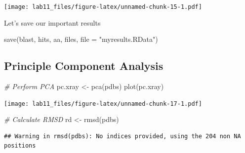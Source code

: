 \documentclass[
]{article}
\newenvironment{Shaded}{\begin{snugshade}}{\end{snugshade}}
\newcommand{\AttributeTok}[1]{\textcolor[rgb]{0.77,0.63,0.00}{#1}}
\newcommand{\CommentTok}[1]{\textcolor[rgb]{0.56,0.35,0.01}{\textit{#1}}}
\newcommand{\FunctionTok}[1]{\textcolor[rgb]{0.00,0.00,0.00}{#1}}
\newcommand{\NormalTok}[1]{#1}
\newcommand{\OtherTok}[1]{\textcolor[rgb]{0.56,0.35,0.01}{#1}}
\newcommand{\SpecialCharTok}[1]{\textcolor[rgb]{0.00,0.00,0.00}{#1}}
\newcommand{\StringTok}[1]{\textcolor[rgb]{0.31,0.60,0.02}{#1}}
\begin{document}
\begin{Shaded}
\end{Shaded}

\texttt{[image: lab11\_files/figure-latex/unnamed-chunk-15-1.pdf]}

Let's save our important results

\begin{Shaded}
\begin{Highlighting}[]
\FunctionTok{save}\NormalTok{(blast, hits, aa, files, }\AttributeTok{file =} \StringTok{"myresults.RData"}\NormalTok{)}
\end{Highlighting}
\end{Shaded}

\hypertarget{principle-component-analysis}{%
\subsection{Principle Component
Analysis}\label{principle-component-analysis}}

\begin{Shaded}
\begin{Highlighting}[]
\CommentTok{\# Perform PCA}
\NormalTok{pc.xray }\OtherTok{\textless{}{-}} \FunctionTok{pca}\NormalTok{(pdbs)}
\FunctionTok{plot}\NormalTok{(pc.xray)}
\end{Highlighting}
\end{Shaded}

\texttt{[image: lab11\_files/figure-latex/unnamed-chunk-17-1.pdf]}

\begin{Shaded}
\begin{Highlighting}[]
\CommentTok{\# Calculate RMSD}
\NormalTok{rd }\OtherTok{\textless{}{-}} \FunctionTok{rmsd}\NormalTok{(pdbs)}
\end{Highlighting}
\end{Shaded}

\begin{verbatim}
## Warning in rmsd(pdbs): No indices provided, using the 204 non NA positions
\end{verbatim}
\end{document}
